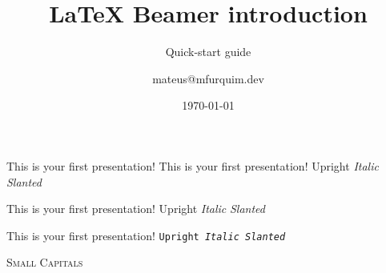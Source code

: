 \documentclass{beamer}
\title {\LaTeX{} Beamer introduction}
\subtitle{Quick-start guide}
\author{mateus@mfurquim.dev}
\institute{MFurquim Dev}
\date{\today}
\begin{document}
\begin{frame}

    This is your first presentation!
	\newline
    \rmfamily This is your first presentation!
	\newline
	\textup{Upright} \textit{Italic} \textsl{Slanted}
	\newline


    \sffamily This is your first presentation!
	\newline
	\textsf{Upright  \textit{Italic} \textsl{Slanted}}
	\newline

    \ttfamily This is your first presentation!
	\newline
	\texttt{Upright  \textit{Italic} \textsl{Slanted}}
	\newline

	\textsc{Small Capitals}

\end{frame}
\end{document}
